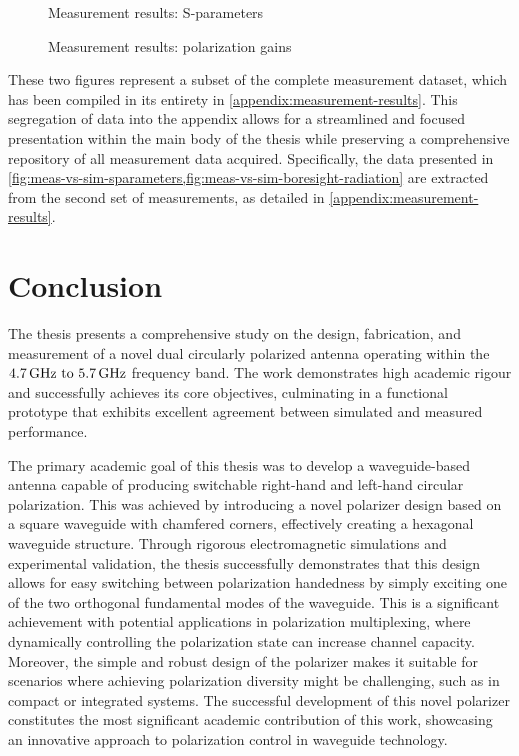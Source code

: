 \documentclass[11pt,a4paper,twoside,openany]{report}
\begin{document}
\begin{figure}[!ht]
    \centering
    
    \caption{\label{fig:meas-vs-sim-sparameters}Measurement results: S-parameters}
\end{figure}

\begin{figure}[!ht]
    \centering
    
    \caption{\label{fig:meas-vs-sim-boresight-radiation}Measurement results: polarization gains}
\end{figure}

These two figures represent a subset of the complete measurement dataset, which has been compiled in its entirety in \cref{appendix:measurement-results}. This segregation of data into the appendix allows for a streamlined and focused presentation within the main body of the thesis while preserving a comprehensive repository of all measurement data acquired. Specifically, the data presented in \cref{fig:meas-vs-sim-sparameters,fig:meas-vs-sim-boresight-radiation} are extracted from the second set of measurements, as detailed in \cref{appendix:measurement-results}.

\chapter*{Conclusion}
\label{chapter:conclusion}

The thesis presents a comprehensive study on the design, fabrication, and measurement of a novel dual circularly polarized antenna operating within the $\frequencyrange$ frequency band. The work demonstrates high academic rigour and successfully achieves its core objectives, culminating in a functional prototype that exhibits excellent agreement between simulated and measured performance.

The primary academic goal of this thesis was to develop a waveguide-based antenna capable of producing switchable right-hand and left-hand circular polarization. This was achieved by introducing a novel polarizer design based on a square waveguide with chamfered corners, effectively creating a hexagonal waveguide structure. Through rigorous electromagnetic simulations and experimental validation, the thesis successfully demonstrates that this design allows for easy switching between polarization handedness by simply exciting one of the two orthogonal fundamental modes of the waveguide. This is a significant achievement with potential applications in polarization multiplexing, where dynamically controlling the polarization state can increase channel capacity. Moreover, the simple and robust design of the polarizer makes it suitable for scenarios where achieving polarization diversity might be challenging, such as in compact or integrated systems. The successful development of this novel polarizer constitutes the most significant academic contribution of this work, showcasing an innovative approach to polarization control in waveguide technology.
\end{document}
